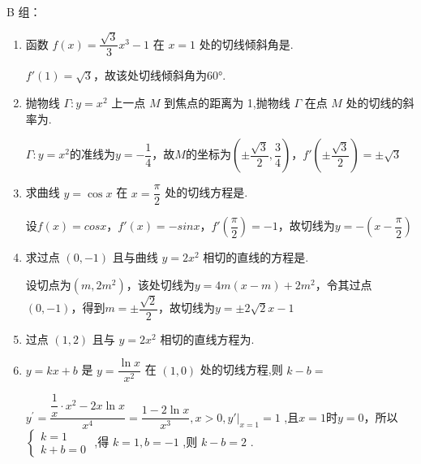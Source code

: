 B 组：
\begin{enumerate}
    \item 函数 $f\left( x\right)  = \dfrac{\sqrt{3}}{3}{x}^{3} - 1$ 在 $x = 1$ 处的切线倾斜角是.
    \begin{jieda}
        $f'(1) = \sqrt{3}$，故该处切线倾斜角为$\ang{60}$.
    \end{jieda}

    \item 抛物线 $\Gamma  : y = {x}^{2}$ 上一点 $M$ 到焦点的距离为 1,抛物线 $\Gamma$ 在点 $M$ 处的切线的斜率为.
    \begin{jieda}
        $\Gamma  : y = {x}^{2}$的准线为$y = -\dfrac{1}{4}$，故$M$的坐标为$\left(\pm \dfrac{\sqrt{3}}{2}, \dfrac{3}{4}\right)$，$f'\left(\pm \dfrac{\sqrt{3}}{2}\right) = \pm \sqrt{3}$
    \end{jieda}

    \item 求曲线 $y = \cos x$ 在 $x = \dfrac{\pi }{2}$ 处的切线方程是.
    \begin{jieda}
        设$f(x) = cosx$，$f'(x) = -sinx$，$f'\left(\dfrac{\pi}{2}\right) = -1$，故切线为$y = -\left(x-\dfrac{\pi}{2}\right)$
    \end{jieda}

    \item 求过点 $\left( {0, - 1}\right)$ 且与曲线 $y = 2{x}^{2}$ 相切的直线的方程是.
    \begin{jieda}
        设切点为$(m, 2m^2)$，该处切线为$y = 4m(x-m)+2m^2$，令其过点 $\left( {0, - 1}\right)$，得到$m = \pm \dfrac{\sqrt{2}}{2}$，故切线为$y = \pm 2\sqrt{2}x-1$
    \end{jieda}

    \item 过点 $\left( {1,2}\right)$ 且与 $y = 2{x}^{2}$ 相切的直线方程为.

    \item $y = {kx} + b$ 是 $y = \dfrac{\ln x}{{x}^{2}}$ 在 $\left( {1,0}\right)$ 处的切线方程,则 $k - b =$
    \begin{jieda}
        ${y}^{\prime } = \dfrac{\dfrac{1}{x} \cdot  {x}^{2} - {2x}\ln x}{{x}^{4}} = \dfrac{1 - 2\ln x}{{x}^{3}},x > 0,y'|_{x=1}  = 1$ ,且$x=1$时$y = 0$，所以 $\left\{  \begin{array}{l} k = 1 \\  k + b = 0 \end{array}\right.$ ,得 $k = 1,b =  - 1$ ,则 $k - b = 2$ .
    \end{jieda}


\end{enumerate}
